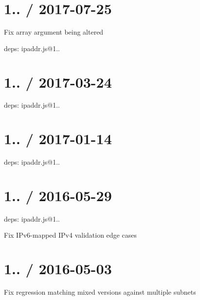 \section*{1.. / 2017-\/07-\/25 }


\begin{DoxyItemize}
\item Fix array argument being altered
\item deps\+: ipaddr.\+js@1..
\end{DoxyItemize}

\section*{1.. / 2017-\/03-\/24 }


\begin{DoxyItemize}
\item deps\+: ipaddr.\+js@1..
\end{DoxyItemize}

\section*{1.. / 2017-\/01-\/14 }


\begin{DoxyItemize}
\item deps\+: ipaddr.\+js@1..
\end{DoxyItemize}

\section*{1.. / 2016-\/05-\/29 }


\begin{DoxyItemize}
\item deps\+: ipaddr.\+js@1..
\begin{DoxyItemize}
\item Fix I\+Pv6-\/mapped I\+Pv4 validation edge cases
\end{DoxyItemize}
\end{DoxyItemize}

\section*{1.. / 2016-\/05-\/03 }


\begin{DoxyItemize}
\item Fix regression matching mixed versions against multiple subnets
\end{DoxyItemize}

